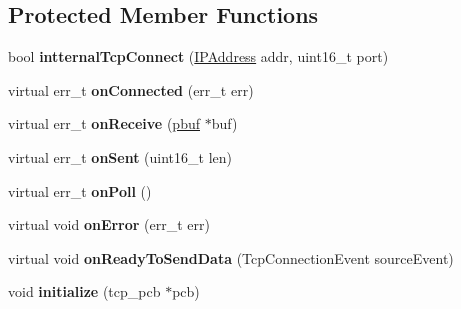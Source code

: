 \subsection*{Protected Member Functions}
\begin{DoxyCompactItemize}
\item 
\hypertarget{class_tcp_connection_a7799e1af79b2a94e0ef2f22ec35f84e4}{}bool {\bfseries intternal\+Tcp\+Connect} (\hyperlink{class_i_p_address}{I\+P\+Address} addr, uint16\+\_\+t port)\label{class_tcp_connection_a7799e1af79b2a94e0ef2f22ec35f84e4}

\item 
\hypertarget{class_tcp_connection_a3428bc222544c79ff0e78c0d41b9fa19}{}virtual err\+\_\+t {\bfseries on\+Connected} (err\+\_\+t err)\label{class_tcp_connection_a3428bc222544c79ff0e78c0d41b9fa19}

\item 
\hypertarget{class_tcp_connection_a393ef974edeac2c7ae2567a3316ded71}{}virtual err\+\_\+t {\bfseries on\+Receive} (\hyperlink{structpbuf}{pbuf} $\ast$buf)\label{class_tcp_connection_a393ef974edeac2c7ae2567a3316ded71}

\item 
\hypertarget{class_tcp_connection_a467b57cb414fcf3f4af31f9293cc157d}{}virtual err\+\_\+t {\bfseries on\+Sent} (uint16\+\_\+t len)\label{class_tcp_connection_a467b57cb414fcf3f4af31f9293cc157d}

\item 
\hypertarget{class_tcp_connection_a4f4f516d32911ca3fb0d32190ff24bbf}{}virtual err\+\_\+t {\bfseries on\+Poll} ()\label{class_tcp_connection_a4f4f516d32911ca3fb0d32190ff24bbf}

\item 
\hypertarget{class_tcp_connection_ab561bbbca2556644949994b5cae7ef81}{}virtual void {\bfseries on\+Error} (err\+\_\+t err)\label{class_tcp_connection_ab561bbbca2556644949994b5cae7ef81}

\item 
\hypertarget{class_tcp_connection_a763da2a7294bceee0f727b780856b252}{}virtual void {\bfseries on\+Ready\+To\+Send\+Data} (Tcp\+Connection\+Event source\+Event)\label{class_tcp_connection_a763da2a7294bceee0f727b780856b252}

\item 
\hypertarget{class_tcp_connection_adebe96bd5f3f5d2bc83f69fb7c7828c5}{}void {\bfseries initialize} (tcp\+\_\+pcb $\ast$pcb)\label{class_tcp_connection_adebe96bd5f3f5d2bc83f69fb7c7828c5}

\end{DoxyCompactItemize}
